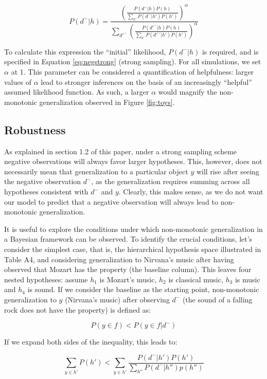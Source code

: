 \documentclass[authoryear,11pt]{elsarticle}
\begin{document}
$$
P(d^-|h) = \frac{\left( \frac{P(d^-|h)P(h)}{\sum_{h'}{P(d^-|h')P(h')}} \right)^{\alpha} }
{\sum\limits_{d'^-}{\left( \frac{P(d'^-|h)P(h)}{\sum_{h'}{P(d'^-|h')P(h')} } \right)^{\alpha} } }
$$

\noindent
To calculate this expression the ``initial'' likelihood, $P(d^-|h)$ is required, and is specified in Equation \ref{eq:negstrong} (strong sampling). For all simulations, we set $\alpha$ at 1. This parameter can be considered a quantification of helpfulness: larger values of $\alpha$ lead to stronger inferences on the basis of an increasingly ``helpful'' assumed likelihood function. As such, a larger $\alpha$ would magnify the non-monotonic generalization observed in Figure \ref{fig:toys}.

\subsection*{Robustness}

As explained in section 1.2 of this paper, under a strong sampling scheme negative observations will always favor larger hypotheses. This, however, does not necessarily mean that generalization to a particular object $y$ will rise after seeing the negative observation $d^-$, as the generalization requires summing across all hypotheses consistent with $d^-$ and $y$. Clearly, this makes sense, as we do not want our model to predict that a negative observation will always lead to non-monotonic generalization.

It is useful to explore the conditions under which non-monotonic generalization in a Bayesian framework can be observed. To identify the crucial conditions, let's consider the simplest case, that is, the hierarchical hypothesis space illustrated in Table A4, and considering generalization to Nirvana's music after having observed that Mozart has the property (the {\sc baseline} column). This leaves four nested hypotheses: assume $h_1$ is Mozart's music, $h_2$ is classical music, $h_3$ is music and $h_4$ is sound. If we consider the {\sc baseline} as the starting point, non-monotonic generalization to $y$ (Nirvana's music) after observing $d^-$ (the sound of a falling rock does not have the property) is defined as:

$$P(y \in f) < P(y \in f|d^-)$$

\noindent If we expand both sides of the inequality, this leads to:

$$\sum_{y \in h'}P(h') < \sum_{y \in h'}{\frac{P(d^-|h')P(h')}{\sum\limits_{h''}{P(d^-|h'')p(h'')}}}$$
\end{document}

